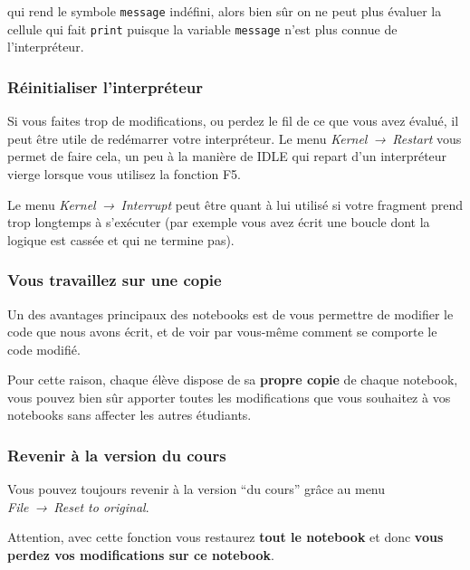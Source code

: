     qui rend le symbole \texttt{message} indéfini, alors bien sûr on ne peut
plus évaluer la cellule qui fait \texttt{print} puisque la variable
\texttt{message} n'est plus connue de l'interpréteur.

    \hypertarget{ruxe9initialiser-linterpruxe9teur}{%
\subsubsection{Réinitialiser
l'interpréteur}\label{ruxe9initialiser-linterpruxe9teur}}

    Si vous faites trop de modifications, ou perdez le fil de ce que vous
avez évalué, il peut être utile de redémarrer votre interpréteur. Le
menu \emph{Kernel~→~Restart} vous permet de faire cela, un peu à la
manière de IDLE qui repart d'un interpréteur vierge lorsque vous
utilisez la fonction F5.

    Le menu \emph{Kernel~→~Interrupt} peut être quant à lui utilisé si votre
fragment prend trop longtemps à s'exécuter (par exemple vous avez écrit
une boucle dont la logique est cassée et qui ne termine pas).

    \hypertarget{vous-travaillez-sur-une-copie}{%
\subsubsection{Vous travaillez sur une
copie}\label{vous-travaillez-sur-une-copie}}

    Un des avantages principaux des notebooks est de vous permettre de
modifier le code que nous avons écrit, et de voir par vous-même comment
se comporte le code modifié.

Pour cette raison, chaque élève dispose de sa \textbf{propre copie} de
chaque notebook, vous pouvez bien sûr apporter toutes les modifications
que vous souhaitez à vos notebooks sans affecter les autres étudiants.

    \hypertarget{revenir-uxe0-la-version-du-cours}{%
\subsubsection{Revenir à la version du
cours}\label{revenir-uxe0-la-version-du-cours}}

    Vous pouvez toujours revenir à la version ``du cours'' grâce au menu
\emph{File~→~Reset to original}.

    Attention, avec cette fonction vous restaurez \textbf{tout le notebook}
et donc \textbf{vous perdez vos modifications sur ce notebook}.

